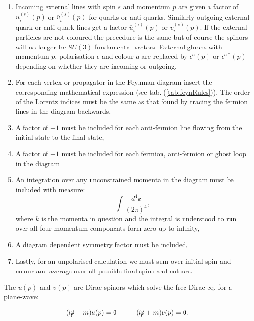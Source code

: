 	\begin{enumerate}
		\item Incoming external lines with spin $s$ and momentum $p$ are given a factor of $u^{(s)}_i(p)$ or
		      $\overline{v}^{(s)}_i(p)$ for quarks or anti-quarks.  Similarly outgoing external quark or
		      anti-quark lines get a factor $\overline{u}^{(s)}_i(p)$ or $v^{(s)}_i(p)$.  If the external particles
		      are not coloured the procedure is the same but of course the spinors will no longer be $SU(3)$
		      fundamental vectors.  External gluons with momentum $p$, polarisation $\epsilon$ and colour $a$ are
		      replaced by $\epsilon^a(p)$ or $\epsilon^{a*}(p)$ depending on whether they are incoming or outgoing.
		\item For each vertex or propagator in the Feynman diagram insert the corresponding mathematical
		      expression (see tab. (\ref{tab:feynRules})).  The order of the Lorentz indices must be the same
		      as that found by tracing the fermion lines in the diagram backwards,
		\item A factor of $-1$ must be included for each anti-fermion line flowing from the initial state
		      to the final state,
		\item A factor of $-1$ must be included for each fermion, anti-fermion or ghost loop in the diagram
		\item An integration over any unconstrained momenta in the diagram must be included with measure:
		      \begin{equation}
		      	\int\frac{d^4k}{(2\pi)^4},
		      \end{equation}
		      where $k$ is the momenta in question and the integral is understood to run over all four momentum
		      components form zero up to infinity,
		\item A diagram dependent symmetry factor must be included,
		\item Lastly, for an unpolarised calculation we must sum over initial spin and colour and average
		      over all possible final spins and colours.
	\end{enumerate}

	The $u(p)$ and $v(p)$ are Dirac spinors which solve the free Dirac eq. for a plane-wave:

	\begin{equation}
		(i\slashed p - m)u(p)=0\hspace{1cm}(i\slashed p + m)v(p)=0.
		\label{eqn:diracPW}
	\end{equation}

